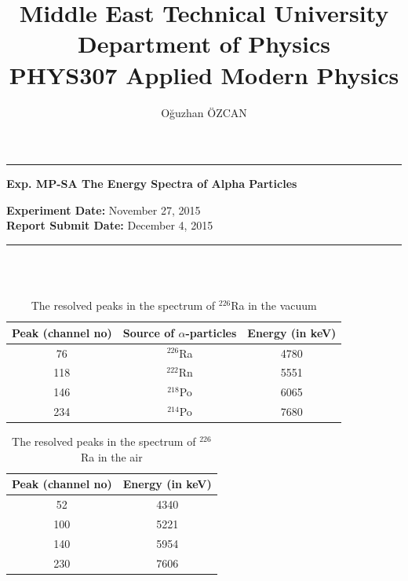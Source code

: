 \documentclass[a4paper,12pt]{article}
\title{Middle East Technical University\\Department of Physics\\\textbf{PHYS307 Applied Modern Physics}}
\author{Oğuzhan ÖZCAN\\}
\date{}
\providecommand{\expdate}[1]{\textbf{Experiment Date:} }
\providecommand{\repdate}[1]{\textbf{Report Submit Date:} }
\providecommand{\expname}[1]{\textbf{Exp. MP-SA The Energy Spectra of Alpha Particles} }
\begin{document}
\maketitle

\thispagestyle{fancy}

\noindent\rule{18.4cm}{0.8pt}
\begin{center}
	\expname{arg1}{}
\end{center}

\expdate{November 6, 2015}{November 27, 2015}\\
\repdate{arg1}{December 4, 2015}\\
\noindent\rule{18.4cm}{0.8pt}\\\\
\begin{table}[h!]
	\begin{center}
	\begin{tabular}{|c|c|c|}
	\hline Peak (channel no) & Source of $\alpha$-particles & Energy (in keV) \\ 
	\hline 76 & $^{226}$Ra & 4780 \\ 
	\hline 118 & $^{222}$Rn & 5551 \\ 
	\hline 146 & $^{218}$Po & 6065 \\ 
	\hline 234 & $^{214}$Po & 7680 \\ 
	\hline 
\end{tabular}
\caption{The resolved peaks in the spectrum of $^{226}$Ra in the vacuum}
\end{center}
\end{table}

\begin{table}[h!]
\begin{center}
		\begin{tabular}{|c|c|}
	\hline Peak (channel no) & Energy (in keV) \\ 
	\hline 52 & 4340 \\ 
	\hline 100 & 5221 \\ 
	\hline 140 & 5954 \\ 
	\hline 230 & 7606 \\ 
	\hline 
	\end{tabular}
	\caption{The resolved peaks in the spectrum of $^{226}$Ra in the air}
\end{center}
\end{table}
\end{document}
